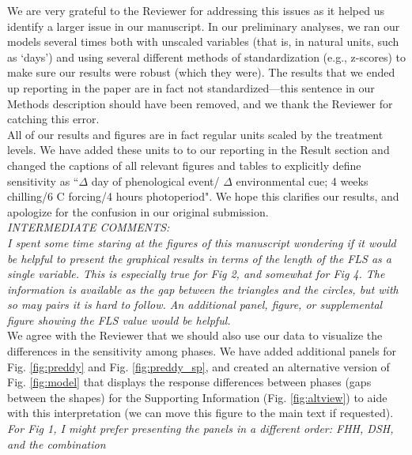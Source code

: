 \documentclass[11pt]{article}
\begin{document}
\noindent We are very grateful to the Reviewer for addressing this issues as it helped us identify a larger issue in our manuscript. In our preliminary analyses, we ran our models several times both with unscaled variables (that is, in natural units, such as `days') and using several different methods of standardization (e.g., z-scores) to make sure our results were robust (which they were). The results that we ended up reporting in the paper are in fact not standardized---this sentence in our Methods description should have been removed, and we thank the Reviewer for catching this error.\\

\noindent All of our results and figures are in fact regular units scaled by the treatment levels. We have added these units to to our reporting in the Result section and changed the captions of all relevant figures and tables to explicitly define sensitivity as ``$\Delta$ day of phenological event/ $\Delta$ environmental cue; 4 weeks chilling/6 \degree C forcing/4 hours photoperiod". We hope this clarifies our results, and apologize for the confusion in our original submission.\\ 

\emph{INTERMEDIATE COMMENTS:}\\
\emph{I spent some time staring at the figures of this manuscript wondering if it would be helpful to present the graphical results in terms of the length of the FLS as a single variable. This is especially true for Fig 2, and somewhat for Fig 4. The information is available as the gap between the triangles and the circles, but with so may pairs it is hard to follow. An additional panel, figure, or supplemental figure showing the FLS value would be helpful.}\\

We agree with the Reviewer that we should also use our data to visualize the differences in the sensitivity among phases. We have added additional panels for Fig. \ref{fig:preddy} and Fig. \ref{fig:preddy_sp}, and created an alternative version of Fig. \ref{fig:model} that displays the response differences between phases (gaps between the shapes) for the Supporting Information (Fig. \ref{fig:altview}) to aide with this interpretation (we can move this figure to the main text if requested). \\ 

\emph{For Fig 1, I might prefer presenting the panels in a different order: FHH, DSH, and the combination}\\
\end{document}
